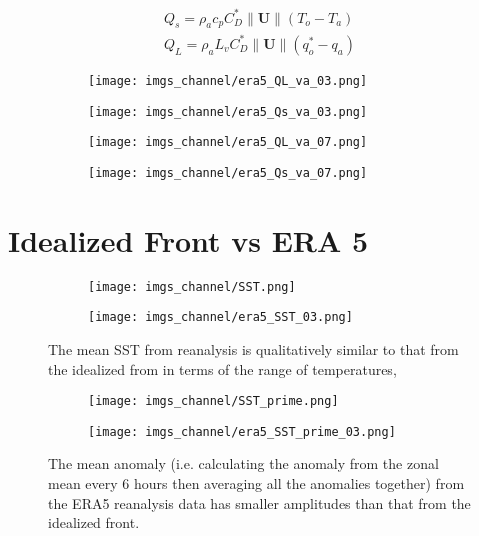 \documentclass[12pt,a4paper]{article}
\newcommand{\Vmag}[1]{\| \mathbf{#1}\|}
\begin{document}
\begin{align}
Q_s = \rho_a c_p  C_D^* \Vmag{U} (T_o-T_a)\\
Q_L = \rho_a L_v  C_D^* \Vmag{U} (q_o^*-q_a)
\end{align}



\begin{figure}[h!]
\centering
\begin{subfigure}[t]{0.49\textwidth}
\texttt{[image: imgs\_channel/era5\_QL\_va\_03.png]}
\end{subfigure}
\begin{subfigure}[t]{0.49\textwidth}
\texttt{[image: imgs\_channel/era5\_Qs\_va\_03.png]}
\end{subfigure}
\end{figure}


\begin{figure}[h!]
\centering
\begin{subfigure}[t]{0.49\textwidth}
\texttt{[image: imgs\_channel/era5\_QL\_va\_07.png]}
\end{subfigure}
\begin{subfigure}[t]{0.49\textwidth}
\texttt{[image: imgs\_channel/era5\_Qs\_va\_07.png]}
\end{subfigure}
\end{figure}


\section{Idealized Front vs ERA 5}

\begin{figure}[h!]
\centering
\begin{subfigure}[t]{0.49\textwidth}
\texttt{[image: imgs\_channel/SST.png]}
\end{subfigure}
\begin{subfigure}[t]{0.49\textwidth}
\texttt{[image: imgs\_channel/era5\_SST\_03.png]}
\end{subfigure}
\caption{The mean SST from reanalysis is qualitatively similar to that from the idealized from in terms of the range of temperatures, }
\end{figure}

\begin{figure}[h!]
\centering
\begin{subfigure}[t]{0.49\textwidth}
\texttt{[image: imgs\_channel/SST\_prime.png]}
\end{subfigure}
\begin{subfigure}[t]{0.49\textwidth}
\texttt{[image: imgs\_channel/era5\_SST\_prime\_03.png]}
\end{subfigure}
\caption{The mean anomaly (i.e. calculating the anomaly from the zonal mean every 6 hours then averaging all the anomalies together) from the ERA5 reanalysis data has smaller amplitudes than that from the idealized front.}
\end{figure}
\end{document}
